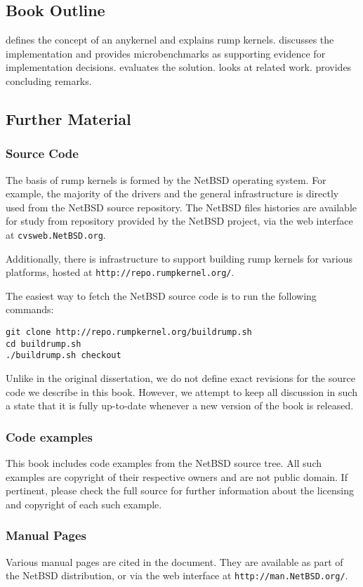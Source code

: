 \subsection{Book Outline}

 defines the concept of an anykernel and explains
rump kernels.
 discusses the implementation and provides
microbenchmarks as supporting evidence for implementation decisions.
 evaluates the solution.
 looks at related work.
 provides concluding remarks.

\subsection{Further Material}

\subsubsection{Source Code}
\label{sect:src}

The basis of rump kernels is formed by the NetBSD operating system.
For example, the majority of the drivers and the general infrastructure
is directly used from the NetBSD source repository.
The NetBSD files histories are available for study from repository
provided by the NetBSD project, \eg via the web interface at
\texttt{cvsweb.NetBSD.org}.

Additionally, there is infrastructure to support building rump kernels
for various platforms, hosted at \texttt{http://repo.rumpkernel.org/}.

The easiest way to fetch the NetBSD source code is to run the following
commands:

\begin{verbatim}
git clone http://repo.rumpkernel.org/buildrump.sh
cd buildrump.sh
./buildrump.sh checkout
\end{verbatim}

Unlike in the original dissertation, we do not define exact revisions
for the source code we describe in this book.  However, we attempt to
keep all discussion in such a state that it is fully up-to-date whenever
a new version of the book is released.

\subsubsection*{Code examples}

This book includes code examples from the NetBSD source
tree.  All such examples are copyright of their respective owners
and are not public domain.  If pertinent, please check the full
source for further information about the licensing and copyright
of each such example.

\subsubsection{Manual Pages}

Various manual pages are cited in the document.  They are available
as part of the NetBSD distribution, or via the web interface
at \texttt{http://man.NetBSD.org/}.
